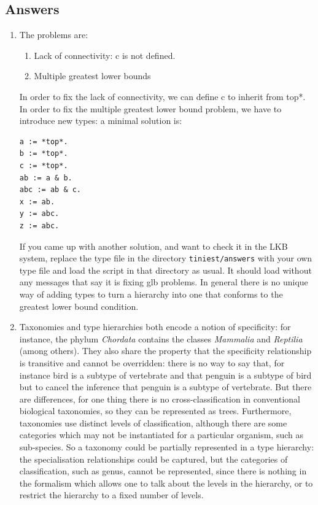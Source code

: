 \documentclass[12pt]{report}
\newcommand{\filename}[1]{{\tt #1}}
\begin{document}
\subsection{Answers}
\begin{enumerate}
\item The problems are:
\begin{enumerate}
\item Lack of connectivity: {\type c} is not defined.
\item Multiple greatest lower bounds
\end{enumerate}
In order to fix the lack of connectivity, we can define {\type c} to
inherit from {\type *top*}.  In order to fix the multiple
greatest lower bound problem, we have to introduce new types: a minimal
solution is:
\begin{verbatim}
a := *top*.
b := *top*.
c := *top*.
ab := a & b.
abc := ab & c.
x := ab.
y := abc.
z := abc.
\end{verbatim}
If you came up with another solution, and want to check it in the 
LKB system, replace the type file in the directory \filename{tiniest/answers}
with your own type file and load the script in that directory as usual.
It should load without any messages that say it is fixing glb problems.
In general there is no unique way of adding types
to turn a hierarchy into one that conforms to the
greatest lower bound condition.
%
\item Taxonomies and type hierarchies both encode a notion
of specificity: for instance, the phylum {\it Chordata} contains
the classes {\it Mammalia} and {\it Reptilia} (among others).
They also share the property that the specificity relationship
is transitive and cannot be overridden: there is no way to say that, for instance
{\type bird} is a subtype of {\type vertebrate} and that
{\type penguin} is a subtype of {\type bird} but to cancel
the inference that {\type penguin} is a subtype of {\type vertebrate}.
But there are differences, for one thing
there is no cross-classification in conventional
biological taxonomies, so they can be represented as trees.
Furthermore, taxonomies use distinct levels of classification,
although there are some categories which may not be
instantiated for a particular organism, such as sub-species.
So a taxonomy could be partially represented in a type hierarchy:
the specialisation relationships could be captured, but
the categories of classification, such as genus,
cannot be represented, since
there is nothing in the formalism which allows one to
talk about the levels in the hierarchy, or to restrict the
hierarchy to a fixed number of levels.


\end{enumerate}
\end{document}
